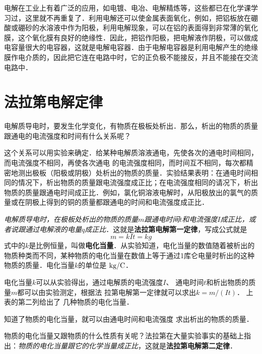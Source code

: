电解在工业上有着广泛的应用，如电镀、电冶、电解精炼等，这些都已在化学课学习过，这里就不再重复了．利用电解还可以使金属表面氧化，例如，把铝板放在硼酸或硼砂的水溶液中作为阳极，利用电解现象，可以在铝的表面得到非常薄的氧化膜，这个氧化膜有良好的绝缘性．因此，把铝作阳极，把电解液作阴极，可以做成电容量很大的电容器，这就是电解电容器．由于电解电容器是利用电解产生的绝缘膜作电介质的，因此把它连在电路中时，它的正负极不能接反，并且不能接在交流电路中．

\section{法拉第电解定律}
电解质导电时，要发生化学变化，有物质在极板处析出．那么，析出的物质的质量跟通电的电流强度和时间有什么关系呢？

这个关系可以用实验来确定．给某种电解质溶液通电，先使各次的通电时间相同，而电流强度不相同，再使各次通电
的电流强度相同，而时间互不相同，每次都精密地测出极板（阳极或阴极）处析出的物质的质量．实验结果表明：在通电时间相同的情况下，析出物质的质量跟电流强度成正比；在电流强度相同的请况下，析出物质的质量跟通电时间成正比．例如，氯化铜溶液电解时，从阳极放出的氯气的质量或在阴极上得到的铜的质量都跟通电的时间和电流强度成正比．

\textit{电解质导电时，在极板处析出的物质的质量$m$跟通电时间$t$和电流强度$I$成正比，或者说跟通过电解液的电量$q$成正比}．这就是\textbf{法拉第电解第一定律}，写成公式就是
\begin{equation}
    m=kIt=kg
\end{equation}
式中的$k$是比例恒量，叫做\textbf{电化当量}．从实验知道，电化当量的数值随着被析出的物质种类而不同，某种物质的电化当量在数值上等于通过1库仑电量时析出的这种物质的质量．电化当量$k$的单位是
${\rm kg}/{\rm C}$．


电化当量$k$可以从实验得出，通过电解质的电流强度$I$、
通电时间$t$和析出物质的质量$m$都可以由实验测定，根据法
拉第电解第一定律就可以求出$k=m/(It)$．
上表的第二列给出了
几种物质的电化当量．

知道了物质的电化当量，就可以由通电时间和电流强度
求出析出的物质的质量．

物质的电化当量又跟物质的什么性质有关呢？法拉第在大量实验事实的基础上指出：\textit{物质的电化当量跟它的化学当量成正比}，这就是\textbf{法拉第电解第二定律}．


